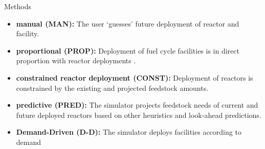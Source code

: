 \documentclass[final]{beamer}
\newlength{\onecolwid}
\newlength{\threecolwid}
\begin{document}
\begin{frame}[t]
\begin{columns}[t,totalwidth=\threecolwid]
\begin{column}{\onecolwid}
\begin{block}{Methods}
	\begin{itemize}
		\item \textbf{manual (MAN):} The user `guesses' future deployment of reactor and facility.
		\item \textbf{proportional (PROP):} Deployment of fuel cycle facilities is in 
		direct proportion with reactor deployments .
		\item \textbf{constrained reactor deployment (CONST):} Deployment of reactors is 
		constrained by the existing and projected feedstock amounts.
		\item \textbf{predictive (PRED):} The simulator projects feedstock needs of 
		current and future deployed reactors based on other heuristics 
		and look-ahead predictions. 
		\item \textbf{Demand-Driven (D-D):} The simulator deploys facilities according
		to demand
	\end{itemize}


\end{block}
\end{column}
\end{columns}
\end{frame}
\end{document}
